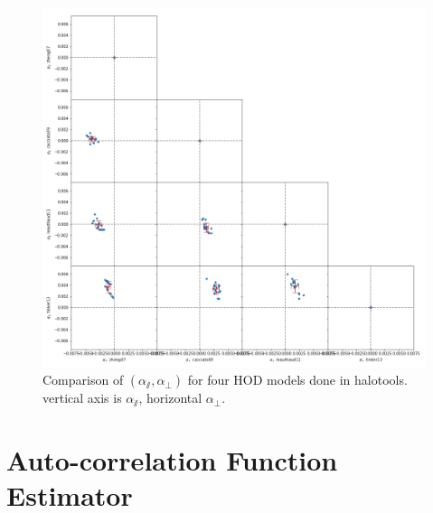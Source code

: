 \documentclass[10pt,A4]{aastex62}
\begin{document}
		\begin{figure}
			\includegraphics[width=\linewidth]{alpha_pair_compare.png}
		    \caption{Comparison of $ (\alpha_\varparallel, \alpha_\perp) $ for four HOD models done in halotools. vertical axis is $\alpha_\varparallel$, horizontal $\alpha_\perp$. }
		    \label{fig:alpha_hod_compare}
		\end{figure}
		


%



\appendix

\section{Auto-correlation Function Estimator}
	\label{appendix_auto_correlation}
	
\end{document}
